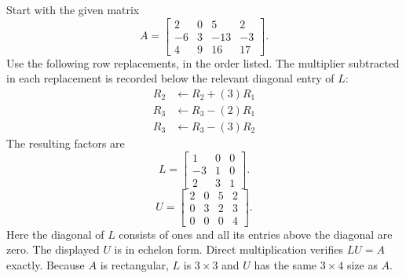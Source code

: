 Start with the given matrix
\[A=\left[\begin{matrix}2 & 0 & 5 & 2\\-6 & 3 & -13 & -3\\4 & 9 & 16 & 17\end{matrix}\right].\]
Use the following row replacements, in the order listed. The multiplier
subtracted in each replacement is recorded below the relevant diagonal
entry of $L$:
\begin{align*}R_{2}&\leftarrow R_{2}+(3)R_{1}\\
R_{3}&\leftarrow R_{3}-(2)R_{1}\\
R_{3}&\leftarrow R_{3}-(3)R_{2}\end{align*}The resulting factors are
\[L=\left[\begin{matrix}1 & 0 & 0\\-3 & 1 & 0\\2 & 3 & 1\end{matrix}\right].\]
\[U=\left[\begin{matrix}2 & 0 & 5 & 2\\0 & 3 & 2 & 3\\0 & 0 & 0 & 4\end{matrix}\right].\]Here the diagonal of $L$ consists of ones and all its entries above
the diagonal are zero. The displayed $U$ is in echelon form.
Direct multiplication verifies $LU=A$ exactly. Because $A$ is rectangular, $L$ is
$3\times3$ and $U$ has the same
$3\times4$ size as $A$.

